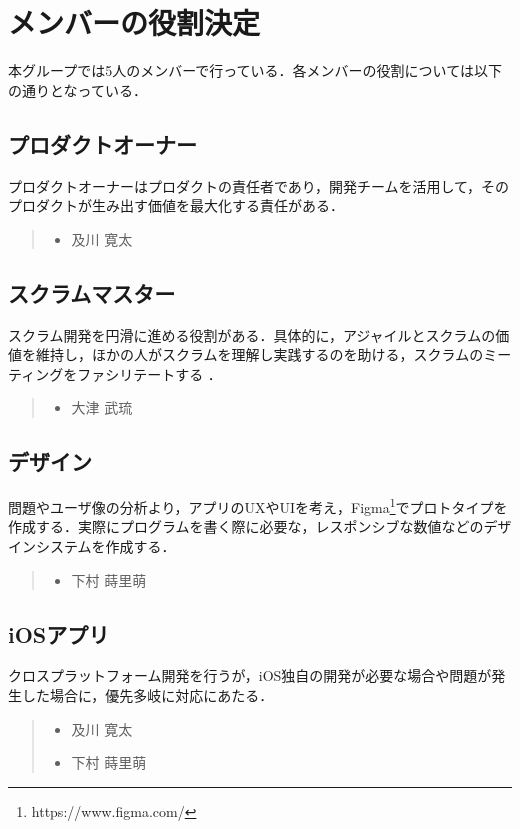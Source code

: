 \section{メンバーの役割決定}
本グループでは5人のメンバーで行っている．各メンバーの役割については以下の通りとなっている．

\subsection{プロダクトオーナー}
プロダクトオーナーはプロダクトの責任者であり，開発チームを活用して，そのプロダクトが生み出す価値を最大化する責任がある\cite{scrum}．
\begin{quote}
    \begin{itemize}
        \item 及川 寛太
    \end{itemize}
\end{quote}

\subsection{スクラムマスター}
スクラム開発を円滑に進める役割がある．具体的に，アジャイルとスクラムの価値を維持し，ほかの人がスクラムを理解し実践するのを助ける，スクラムのミーティングをファシリテートする \cite{scrummaster}．
\begin{quote}
    \begin{itemize}
        \item 大津 武琉
    \end{itemize}
\end{quote}

\subsection{デザイン}
問題やユーザ像の分析より，アプリのUXやUIを考え，Figma\footnote{https://www.figma.com/}でプロトタイプを作成する．実際にプログラムを書く際に必要な，レスポンシブな数値などのデザインシステムを作成する．
\begin{quote}
    \begin{itemize}
        \item 下村 蒔里萌
    \end{itemize}
\end{quote}

\subsection{iOSアプリ}
クロスプラットフォーム開発を行うが，iOS独自の開発が必要な場合や問題が発生した場合に，優先多岐に対応にあたる．
\begin{quote}
    \begin{itemize}
        \item 及川 寛太
        \item 下村 蒔里萌
    \end{itemize}
\end{quote}
\pagebreak
